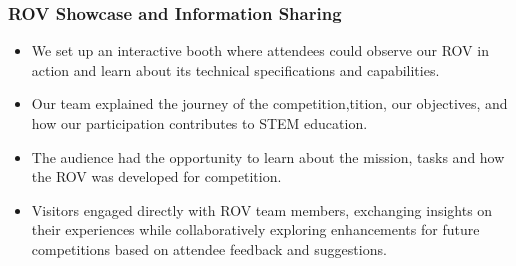 \documentclass[a4paper,12pt]{article}
\begin{document}
\subsubsection{ROV Showcase and Information Sharing}
\begin{itemize}
    \item We set up an interactive booth where attendees could observe our ROV in action and learn about its technical specifications and capabilities.
    \item Our team explained the journey of the competition,tition, our objectives, and how our participation contributes to STEM education.
    \item The audience had the opportunity to learn about the mission, tasks and how the ROV was developed for competition.
    \item Visitors engaged directly with ROV team members, exchanging insights on their experiences while collaboratively exploring enhancements for future competitions based on attendee feedback and suggestions.
\end{itemize}
\end{document}

